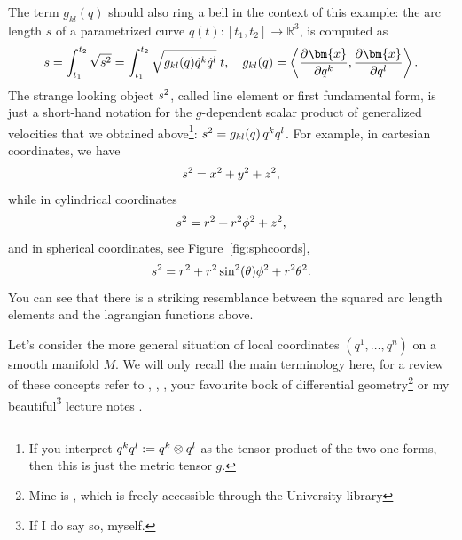 \documentclass[english,fontsize=11pt,paper=a5,oneside]{scrbook}
\newcommand{\R}{\mathbb{R}}
\newcommand{\bx}{\bm{x}}
\newcommand{\lag}{\langle}
\newcommand{\rag}{\rangle}
\let\d\relax
\newcommand{\d}{\mathrm{d}}
\theoremstyle{definition}
\begin{document}
The term $g_{kl} (q)$ should also ring a bell in the context of this example: the arc length $s$ of a parametrized curve $q(t) : [t_1,t_2] \to \R^3$, is computed as
\begin{equation}\label{eq:arclen}
  \begin{aligned}
    s = \int_{t_1}^{t_2} \sqrt{\d s^2} = \int_{t_1}^{t_2} \sqrt{g_{kl}(q)\dot q^k \dot q^l} \;\d t,\quad
    g_{kl} (q) = \left\lag\frac{\partial\bx}{\partial q^k}, \frac{\partial \bx}{\partial q^l}\right\rag.
  \end{aligned}
\end{equation}
The strange looking object $\d s^2$, called line element or first fundamental form, is just a short-hand notation for the $g$-dependent scalar product of generalized velocities that we obtained above\footnote{If you interpret $\d q^k \d q^l := \d q^k \otimes \d q^l$ as the tensor product of the two one-forms, then this is just the metric tensor $g$.}: $\d s^2 = g_{kl}(q)\, \d q^k \d q^l$.
For example, in cartesian coordinates, we have
\begin{equation}
  \d s^2 = \d x^2 + \d y^2 + \d z^2,
\end{equation}
while in cylindrical coordinates
\begin{equation}
  \d s^2 = \d r^2 + r^2 \d \phi^2 + \d z^2,
\end{equation}
and in spherical coordinates, see Figure~\ref{fig:sphcoords},
\begin{equation}\label{eq:spharc}
  \d s^2 = \d r^2 + r^2 \sin^2(\theta) \d \phi^2 + r^2 \d \theta^2.
\end{equation}
You can see that there is a striking resemblance between the squared arc length elements and the lagrangian functions above. \medskip

Let's consider the more general situation of local coordinates $(q^1, \ldots, q^n)$ on a smooth manifold $M$.
We will only recall the main terminology here, for a review of these concepts refer to \cite[Chapter 4.18]{book:arnold}, \cite[Appendix A]{book:knauf}, \cite[Chapter 4]{book:marsdenratiu}, your favourite book of differential geometry\footnote{Mine is \cite{book:lee}, which is freely accessible through the University library} or my beautiful\footnote{If I do say so, myself.} lecture notes \cite{lectures:aom:seri}.
\end{document}
